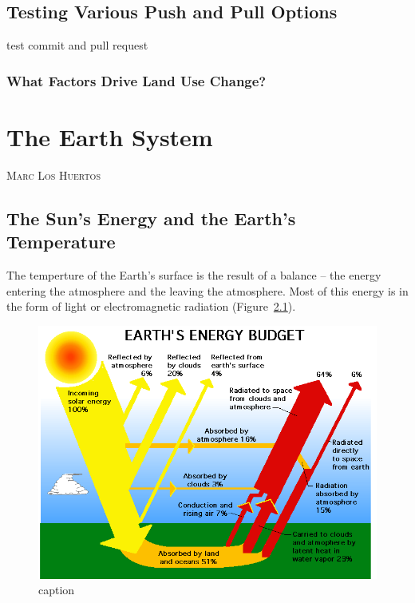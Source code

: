 \documentclass{book}\usepackage{knitr}
\makeatletter
\newcommand{\chapterauthor}[1]{%
  {\parindent0pt\vspace*{-25pt}%
  \linespread{1.1}\large\scshape#1%
  \par\nobreak\vspace*{35pt}}
  \@afterheading%
}
\makeatother
\begin{document}
\section{Testing Various Push and Pull Options}

test commit and pull request 


\subsection{What Factors Drive Land Use Change?}





\mainmatter


\chapter{The Earth System}\label{earthsystem}

\chapterauthor{Marc Los Huertos}

\section{The Sun's Energy and the Earth's Temperature}

The temperture of the Earth's surface is the result of a balance -- the energy entering the atmosphere and the leaving the atmosphere. Most of this energy is in the form of light or electromagnetic radiation (Figure~\ref{fig:earthbudget}). 

\begin{figure}
\includegraphics[width=\linewidth]{images/earth-system/earth-rad-budget-nasa-erbe.png}
\caption{caption}
\label{fig:earthbudget}
\end{figure}
\end{document}
